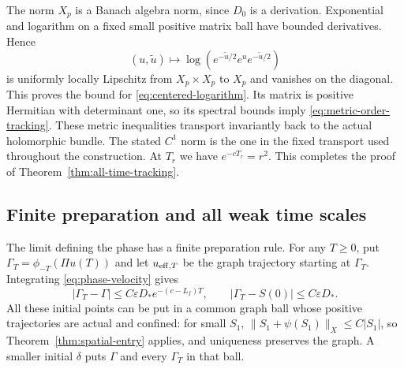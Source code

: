 The norm $X_p$ is a Banach algebra norm, since $D_0$ is
a derivation. Exponential and logarithm on a fixed small
positive matrix ball have bounded derivatives. Hence
\[
 (u,\widetilde u)\longmapsto
             \log(e^{-\widetilde u/2}e^ue^{-\widetilde u/2})
\]
is uniformly locally Lipschitz from $X_p\times X_p$ to
$X_p$ and vanishes on the diagonal. This proves the
bound for \eqref{eq:centered-logarithm}. Its matrix is
positive Hermitian with determinant one, so its spectral
bounds imply \eqref{eq:metric-order-tracking}. These
metric inequalities transport invariantly back to the
actual holomorphic bundle. The stated $C^1$ norm is the
one in the fixed transport used throughout the construction.
At $T_r$ we have $e^{-cT_r}=r^2$. This completes the
proof of Theorem~\ref{thm:all-time-tracking}.

\subsection{Finite preparation and all weak time scales}

The limit defining the phase has a finite preparation rule.
For any $T\ge0$, put $\Gamma_T=\phi_{-T}(\Pi u(T))$
and let $u_{{\rm eff},T}$ be the graph trajectory starting
at $\Gamma_T$. Integrating \eqref{eq:phase-velocity} gives
\begin{equation}\label{eq:finite-phase-error}
 |\Gamma_T-\Gamma|\le C\varepsilon D_*e^{-(c-L_f)T},
 \qquad |\Gamma_T-S(0)|\le C\varepsilon D_*.
\end{equation}
All these initial points can be put in a common graph
ball whose positive trajectories are actual and confined:
for small $S_1$, $\|S_1+\psi(S_1)\|_X\le C|S_1|$,
so Theorem~\ref{thm:spatial-entry} applies, and uniqueness
preserves the graph. A smaller initial $\delta$ puts
$\Gamma$ and every $\Gamma_T$ in that ball.

